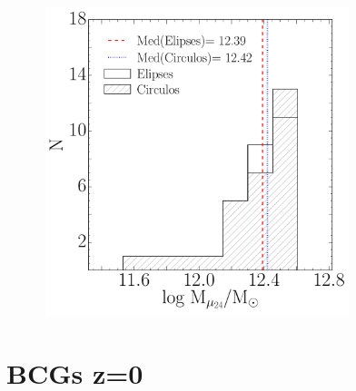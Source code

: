 \begin{figure}[H]
 \centering
 \includegraphics[height=9cm, width=9cm]{../al_final/LR/evolucion/histogramas/Mmu_elipse_vs_circ.pdf}
\end{figure}

\section{BCGs z=0}


